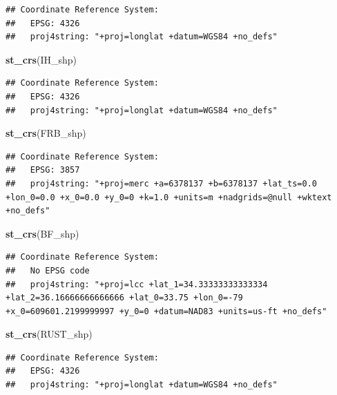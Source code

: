 \documentclass[12pt,]{article}
\newenvironment{Shaded}{\begin{snugshade}}{\end{snugshade}}
\newcommand{\KeywordTok}[1]{\textcolor[rgb]{0.13,0.29,0.53}{\textbf{#1}}}
\newcommand{\NormalTok}[1]{#1}
\begin{document}
\begin{verbatim}
## Coordinate Reference System:
##   EPSG: 4326 
##   proj4string: "+proj=longlat +datum=WGS84 +no_defs"
\end{verbatim}

\begin{Shaded}
\begin{Highlighting}[]
\KeywordTok{st_crs}\NormalTok{(IH_shp)}
\end{Highlighting}
\end{Shaded}

\begin{verbatim}
## Coordinate Reference System:
##   EPSG: 4326 
##   proj4string: "+proj=longlat +datum=WGS84 +no_defs"
\end{verbatim}

\begin{Shaded}
\begin{Highlighting}[]
\KeywordTok{st_crs}\NormalTok{(FRB_shp)}
\end{Highlighting}
\end{Shaded}

\begin{verbatim}
## Coordinate Reference System:
##   EPSG: 3857 
##   proj4string: "+proj=merc +a=6378137 +b=6378137 +lat_ts=0.0 +lon_0=0.0 +x_0=0.0 +y_0=0 +k=1.0 +units=m +nadgrids=@null +wktext +no_defs"
\end{verbatim}

\begin{Shaded}
\begin{Highlighting}[]
\KeywordTok{st_crs}\NormalTok{(BF_shp)}
\end{Highlighting}
\end{Shaded}

\begin{verbatim}
## Coordinate Reference System:
##   No EPSG code
##   proj4string: "+proj=lcc +lat_1=34.33333333333334 +lat_2=36.16666666666666 +lat_0=33.75 +lon_0=-79 +x_0=609601.2199999997 +y_0=0 +datum=NAD83 +units=us-ft +no_defs"
\end{verbatim}

\begin{Shaded}
\begin{Highlighting}[]
\KeywordTok{st_crs}\NormalTok{(RUST_shp)}
\end{Highlighting}
\end{Shaded}

\begin{verbatim}
## Coordinate Reference System:
##   EPSG: 4326 
##   proj4string: "+proj=longlat +datum=WGS84 +no_defs"
\end{verbatim}
\end{document}
